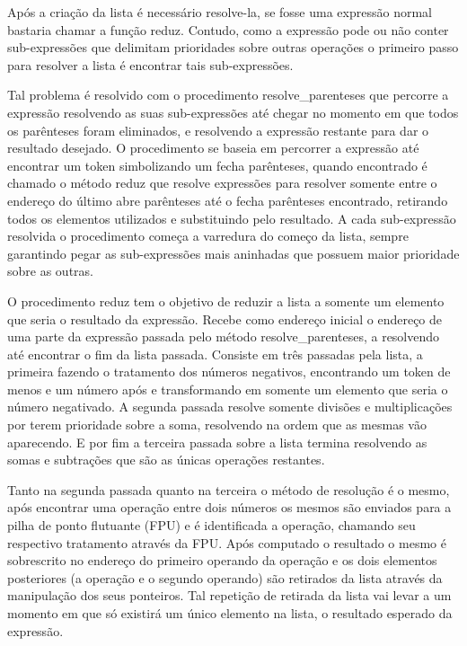 \documentclass[12pt]{article}
\begin{document}
Após a criação da lista é necessário resolve-la, se fosse uma expressão normal bastaria chamar a função reduz. Contudo, como a expressão pode ou não conter sub-expressões que delimitam prioridades sobre outras operações o primeiro passo para resolver a lista é encontrar tais sub-expressões.

Tal problema é resolvido com o procedimento resolve\_parenteses que percorre a expressão resolvendo as suas sub-expressões até chegar no momento em que todos os parênteses foram eliminados, e resolvendo a expressão restante para dar o resultado desejado. O procedimento se baseia em percorrer a expressão até encontrar um token simbolizando um fecha parênteses, quando encontrado é chamado o método reduz que resolve expressões para resolver somente entre o endereço do último abre parênteses até o fecha parênteses encontrado, retirando todos os elementos utilizados e substituindo pelo resultado. A cada sub-expressão resolvida o procedimento começa a varredura do começo da lista, sempre garantindo pegar as sub-expressões mais aninhadas que possuem maior prioridade sobre as outras.

O procedimento reduz tem o objetivo de reduzir a lista a somente um elemento que seria o resultado da expressão. Recebe como endereço inicial o endereço de uma parte da expressão passada pelo método resolve\_parenteses, a resolvendo até encontrar o fim da lista passada. Consiste em três passadas pela lista, a primeira fazendo o tratamento dos números negativos, encontrando um token de menos e um número após e transformando em somente um elemento que seria o número negativado. A segunda passada resolve somente divisões e multiplicações por terem prioridade sobre a soma, resolvendo na ordem que as mesmas vão aparecendo. E por fim a terceira passada sobre a lista termina resolvendo as somas e subtrações que são as únicas operações restantes.

Tanto na segunda passada quanto na terceira o método de resolução é o mesmo, após encontrar uma operação entre dois números os mesmos são enviados para a pilha de ponto flutuante (FPU) e é identificada a operação, chamando seu respectivo tratamento através da FPU. Após computado o resultado o mesmo é sobrescrito no endereço do primeiro operando da operação e os dois elementos posteriores (a operação e o segundo operando) são retirados da lista através da manipulação dos seus ponteiros. Tal repetição de retirada da lista vai levar a um momento em que só existirá um único elemento na lista, o resultado esperado da expressão. 
\end{document}
